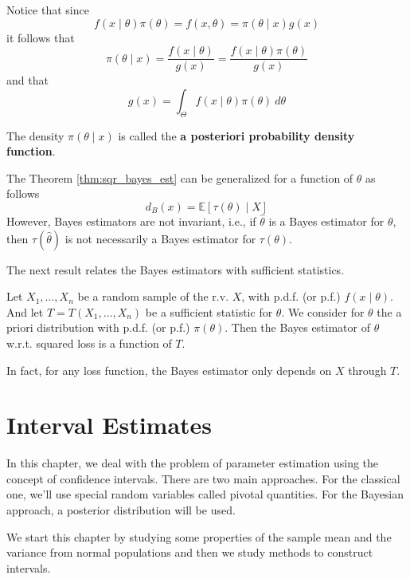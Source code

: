 \documentclass[12pt,a4paper]{report}
\begin{document}
Notice that since 
\begin{equation*}
    f(x \mid \theta) \pi(\theta) = f(x, \theta) = \pi(\theta \mid x) g(x)
\end{equation*}
it follows that 
\begin{equation}\label{eq:202301270955}
    \pi(\theta \mid x) = \frac{f(x \mid \theta)}{g(x)} = \frac{f(x \mid \theta) \pi(\theta)}{g(x)}
\end{equation}
and that 
\begin{equation*}
    g(x) = \int_\Theta f(x \mid \theta) \pi(\theta) ~d\theta
\end{equation*}

The density $\pi(\theta \mid x)$ is called the \textbf{a posteriori probability density function}. 

The Theorem \ref{thm:sqr_bayes_est} can be generalized for a function of $\theta$ as follows 
\[
    d_B(x) = \mathbb{E}[\tau(\theta) \mid X]
\]
However, Bayes estimators are not invariant, i.e., if $\hat{\theta}$ is a Bayes estimator for $\theta$, then $\tau(\hat{\theta})$ is not necessarily a Bayes estimator for $\tau(\theta)$.

The next result relates the Bayes estimators with sufficient statistics.

\begin{theorem}
    Let $X_1, \ldots, X_n$ be a random sample of the r.v. $X$, with p.d.f. (or p.f.) $f(x \mid \theta)$. And let $T = T(X_1, \ldots, X_n)$ be a sufficient statistic for $\theta$. We consider for $\theta$ the a priori distribution with p.d.f. (or p.f.) $\pi(\theta)$. Then the Bayes estimator of $\theta$ w.r.t. squared loss is a function of $T$.
\end{theorem}

In fact, for any loss function, the Bayes estimator only depends on $X$ through $T$.

\chapter{Interval Estimates}

In this chapter, we deal with the problem of parameter estimation using the concept of confidence intervals. There are two main approaches. For the classical one, we'll use special random variables called pivotal quantities. For the Bayesian approach, a posterior distribution will be used. 

We start this chapter by studying some properties of the sample mean and the variance from normal populations and then we study methods to construct intervals.
\end{document}
